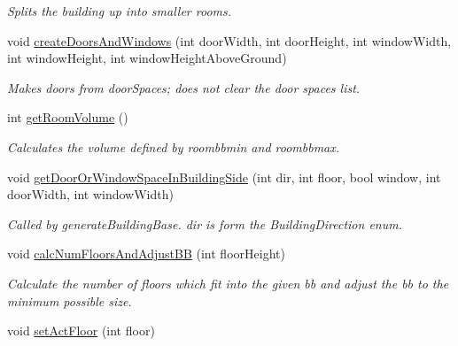 \begin{DoxyCompactItemize}
\begin{DoxyCompactList}\small\item\em \-Splits the building up into smaller rooms. \end{DoxyCompactList}\item 
\hypertarget{structLevel_1_1Building_adeebf13463350a14c851271a7dcaead0}{
void \hyperlink{structLevel_1_1Building_adeebf13463350a14c851271a7dcaead0}{create\-Doors\-And\-Windows} (int door\-Width, int door\-Height, int window\-Width, int window\-Height, int window\-Height\-Above\-Ground)}
\label{db/da2/structLevel_1_1Building_adeebf13463350a14c851271a7dcaead0}

\begin{DoxyCompactList}\small\item\em \-Makes doors from door\-Spaces; does not clear the door spaces list. \end{DoxyCompactList}\item 
\hypertarget{structLevel_1_1Building_abb742299d41e431c9f3cf8c6a4b99ef9}{
int \hyperlink{structLevel_1_1Building_abb742299d41e431c9f3cf8c6a4b99ef9}{get\-Room\-Volume} ()}
\label{db/da2/structLevel_1_1Building_abb742299d41e431c9f3cf8c6a4b99ef9}

\begin{DoxyCompactList}\small\item\em \-Calculates the volume defined by roombbmin and roombbmax. \end{DoxyCompactList}\item 
\hypertarget{structLevel_1_1Building_a6dc68340332de9de8bd7299046d6a540}{
void \hyperlink{structLevel_1_1Building_a6dc68340332de9de8bd7299046d6a540}{get\-Door\-Or\-Window\-Space\-In\-Building\-Side} (int dir, int floor, bool window, int door\-Width, int window\-Width)}
\label{db/da2/structLevel_1_1Building_a6dc68340332de9de8bd7299046d6a540}

\begin{DoxyCompactList}\small\item\em \-Called by generate\-Building\-Base. dir is form the \-Building\-Direction enum. \end{DoxyCompactList}\item 
\hypertarget{structLevel_1_1Building_a701e5eacd9ec89eb3b4e85cdc4e4a081}{
void \hyperlink{structLevel_1_1Building_a701e5eacd9ec89eb3b4e85cdc4e4a081}{calc\-Num\-Floors\-And\-Adjust\-B\-B} (int floor\-Height)}
\label{db/da2/structLevel_1_1Building_a701e5eacd9ec89eb3b4e85cdc4e4a081}

\begin{DoxyCompactList}\small\item\em \-Calculate the number of floors which fit into the given bb and adjust the bb to the minimum possible size. \end{DoxyCompactList}\item 
\hypertarget{structLevel_1_1Building_a3224b49575fa8e4ec1f31012421de85b}{
void \hyperlink{structLevel_1_1Building_a3224b49575fa8e4ec1f31012421de85b}{set\-Act\-Floor} (int floor)}
\label{db/da2/structLevel_1_1Building_a3224b49575fa8e4ec1f31012421de85b}


\end{DoxyCompactItemize}
